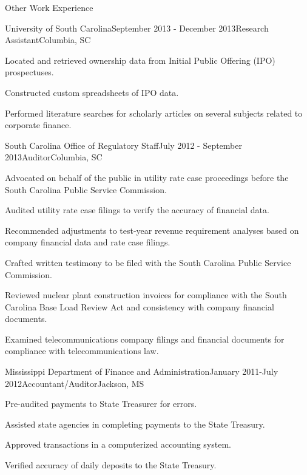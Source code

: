\documentclass{resume} %
\begin{document}
\begin{rSection}{Other Work Experience}
    


\begin{rSubsection}{University of South Carolina}{September 2013 - December 2013}{Research Assistant}{Columbia, SC}
    \item Located and retrieved ownership data from Initial Public Offering (IPO) prospectuses.
    \item Constructed custom spreadsheets of IPO data.
    \item Performed literature searches for scholarly articles on several subjects related to corporate finance.
\end{rSubsection}

\begin{rSubsection}{South Carolina Office of Regulatory Staff}{July 2012 - September 2013}{Auditor}{Columbia, SC}
    \item Advocated on behalf of the public in utility rate case proceedings before the South Carolina Public Service Commission.
    \item Audited utility rate case filings to verify the accuracy of financial data.
    \item Recommended adjustments to test-year revenue requirement analyses based on company financial data and rate case filings.
    \item Crafted written testimony to be filed with the South Carolina Public Service Commission.
    \item Reviewed nuclear plant construction invoices for compliance with the South Carolina Base Load Review Act and consistency with company financial documents.
    \item Examined telecommunications company filings and financial documents for compliance with telecommunications law.

\end{rSubsection}

\begin{rSubsection}{Mississippi Department of Finance and Administration}{January 2011-July 2012}{Accountant/Auditor}{Jackson, MS}
    \item Pre-audited payments to State Treasurer for errors.
    \item Assisted state agencies in completing payments to the State Treasury.
    \item Approved transactions in a computerized accounting system.
    \item Verified accuracy of daily deposits to the State Treasury.

\end{rSubsection}
\end{rSection}
\end{document}
